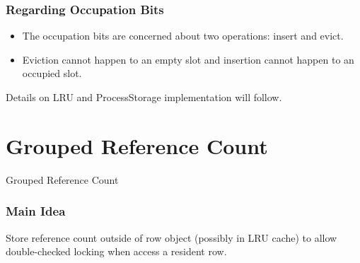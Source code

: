 \documentclass{beamer}
\begin{document}
\begin{frame}
\frametitle{Regarding Occupation Bits}
\begin{itemize}
\item The occupation bits are concerned about two operations: insert and evict.
\item Eviction cannot happen to an empty slot and insertion cannot happen to an 
occupied slot.
\end{itemize}
\end{frame}

\begin{frame}
Details on LRU and ProcessStorage implementation will follow.
\end{frame}

\section{Grouped Reference Count}

\begin{frame}
Grouped Reference Count
\end{frame}


\begin{frame}
\frametitle{Main Idea}

Store reference count outside of row object (possibly in LRU cache) to allow 
double-checked locking when access a resident row.

\end{frame}
\end{document}
